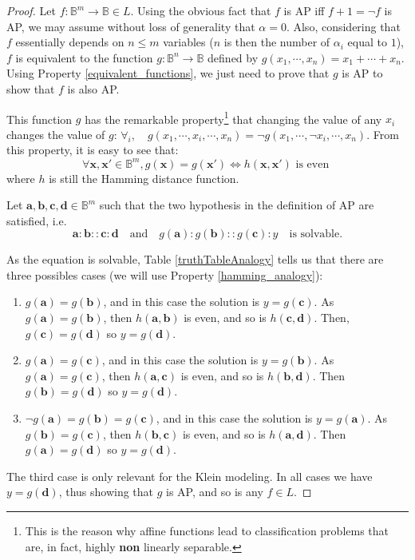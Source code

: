 \documentclass[article]{amsart}
\begin{document}
\begin{proof}
Let $f \colon \mathbb{B}^m \to \mathbb{B} \in L$. Using the obvious fact that
  $f$ is AP  iff $f + 1 = \neg f$ is AP, we may assume without loss of generality that
  $\alpha = 0$. Also, considering that $f$ essentially depends on $n \leq m$
  variables ($n$ is then the number of $\alpha_i$ equal to $1$), $f$ is
  equivalent to the function $g \colon \mathbb{B}^n \to \mathbb{B}$ defined by
  $g(x_1, \cdots, x_n) = x_1 +  \cdots + x_n$. Using Property
  \ref{equivalent_functions}, we just need to prove that $g$ is AP to show that
  $f$ is also AP.

  This function $g$ has the remarkable property\footnote{This is the reason why affine
  functions lead to classification problems that are, in fact, highly
  \textbf{non} linearly separable.} that changing the value of any
  $x_i$ changes the value of $g$: $\forall _i, \quad g(x_1, \cdots, x_i, \cdots, x_n) =
  \neg g(x_1, \cdots, \neg x_i, \cdots, x_n)$. From this property, it is easy to
  see that:
  $$\forall \mathbf{x}, \mathbf{x}' \in \mathbb{B}^m, g(\mathbf{x}) =
  g(\mathbf{x}') \iff h(\mathbf{x}, \mathbf{x}') \text{ is even }$$
  where $h$ is still the Hamming distance function.

  Let $\mathbf{a}, \mathbf{b}, \mathbf{c}, \mathbf{d} \in \mathbb{B}^m$  such
  that the two hypothesis in the definition of AP are satisfied, i.e.
  $$
  \mathbf{a} : \mathbf{b} :: \mathbf{c} : \mathbf{d}\quad \text{and}\quad
  g(\mathbf{a}) : g(\mathbf{b}) :: g(\mathbf{c}) : y\quad  \text{is  solvable}.
  $$

  As the equation is solvable, Table \ref{truthTableAnalogy} tells us that
  there are three possibles cases (we will use Property
  \ref{hamming_analogy}):
  \begin{enumerate}
    \item $g(\mathbf{a}) = g(\mathbf{b})$, and in this case the solution is
      $y = g(\mathbf{c})$. As $g(\mathbf{a}) = g(\mathbf{b})$, then
      $h(\mathbf{a}, \mathbf{b})$ is even, and so is $h(\mathbf{c},
      \mathbf{d})$. Then, $g(\mathbf{c}) = g(\mathbf{d})$ so $y = g(\mathbf{d})$.
    \item $g(\mathbf{a}) = g(\mathbf{c})$, and in this case the solution is $y =
      g(\mathbf{b})$. As $g(\mathbf{a}) = g(\mathbf{c})$, then
      $h(\mathbf{a}, \mathbf{c})$ is even, and so is $h(\mathbf{b},
      \mathbf{d})$. Then $g(\mathbf{b}) = g(\mathbf{d})$ so $y =
      g(\mathbf{d})$.
    \item $\neg g(\mathbf{a}) = g(\mathbf{b}) = g(\mathbf{c})$, and in this
      case the solution is $y = g(\mathbf{a})$. As $g(\mathbf{b}) =
      g(\mathbf{c})$, then $h(\mathbf{b}, \mathbf{c})$ is even, and so is
      $h(\mathbf{a}, \mathbf{d})$. Then $g(\mathbf{a}) = g(\mathbf{d})$ so $y =
      g(\mathbf{d})$.
  \end{enumerate}

  The third case is only relevant for the Klein modeling. In all cases we have
  $y = g(\mathbf{d})$, thus showing that $g$ is AP, and so is any $f \in L$.
\end{proof}
\end{document}
